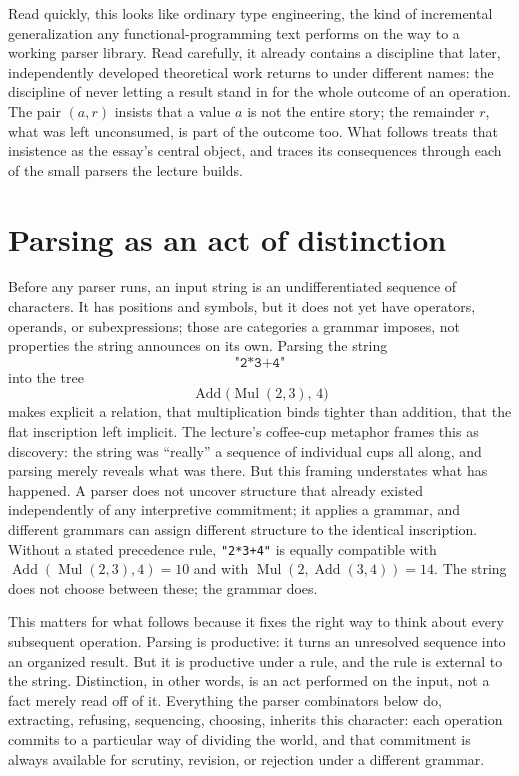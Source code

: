 \documentclass[11pt]{article}
\begin{document}
Read quickly, this looks like ordinary type engineering, the kind of incremental generalization any functional-programming text performs on the way to a working parser library. Read carefully, it already contains a discipline that later, independently developed theoretical work returns to under different names: the discipline of never letting a result stand in for the whole outcome of an operation. The pair $(a, r)$ insists that a value $a$ is not the entire story; the remainder $r$, what was left unconsumed, is part of the outcome too. What follows treats that insistence as the essay's central object, and traces its consequences through each of the small parsers the lecture builds.

\section{Parsing as an act of distinction}

Before any parser runs, an input string is an undifferentiated sequence of characters. It has positions and symbols, but it does not yet have operators, operands, or subexpressions; those are categories a grammar imposes, not properties the string announces on its own. Parsing the string
\[
\texttt{"2*3+4"}
\]
into the tree
\[
\operatorname{Add}\bigl(\operatorname{Mul}(2,3),\,4\bigr)
\]
makes explicit a relation, that multiplication binds tighter than addition, that the flat inscription left implicit. The lecture's coffee-cup metaphor frames this as discovery: the string was ``really'' a sequence of individual cups all along, and parsing merely reveals what was there. But this framing understates what has happened. A parser does not uncover structure that already existed independently of any interpretive commitment; it applies a grammar, and different grammars can assign different structure to the identical inscription. Without a stated precedence rule, \texttt{"2*3+4"} is equally compatible with $\operatorname{Add}(\operatorname{Mul}(2,3),4) = 10$ and with $\operatorname{Mul}(2,\operatorname{Add}(3,4)) = 14$. The string does not choose between these; the grammar does.

This matters for what follows because it fixes the right way to think about every subsequent operation. Parsing is productive: it turns an unresolved sequence into an organized result. But it is productive under a rule, and the rule is external to the string. Distinction, in other words, is an act performed on the input, not a fact merely read off of it. Everything the parser combinators below do, extracting, refusing, sequencing, choosing, inherits this character: each operation commits to a particular way of dividing the world, and that commitment is always available for scrutiny, revision, or rejection under a different grammar.
\end{document}

